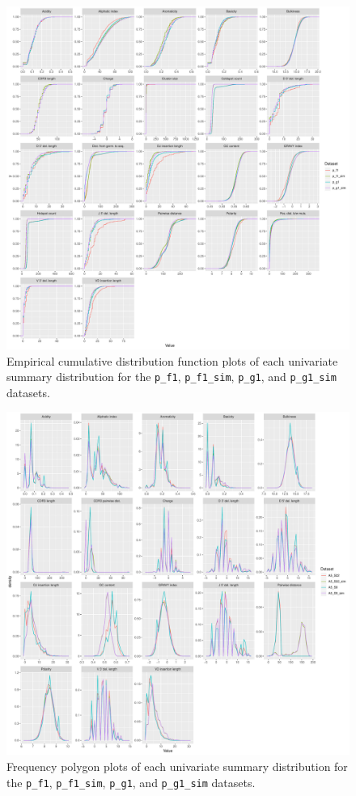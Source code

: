 \documentclass{article}
\begin{document}
\begin{figure}
    \includegraphics[width=\linewidth]{Figures/partis_ecdf.pdf}
    \caption{Empirical cumulative distribution function plots of each univariate summary distribution for the \texttt{p\_f1}, \texttt{p\_f1\_sim}, \texttt{p\_g1}, and \texttt{p\_g1\_sim} datasets.}
    \label{fig:PartisECDFs}
\end{figure}

\begin{figure}
    \includegraphics[width=\linewidth]{Figures/igor_freqpoly.pdf}
    \caption{Frequency polygon plots of each univariate summary distribution for the \texttt{p\_f1}, \texttt{p\_f1\_sim}, \texttt{p\_g1}, and \texttt{p\_g1\_sim} datasets.}
    \label{fig:IgorFreqPolys}
\end{figure}
\end{document}

